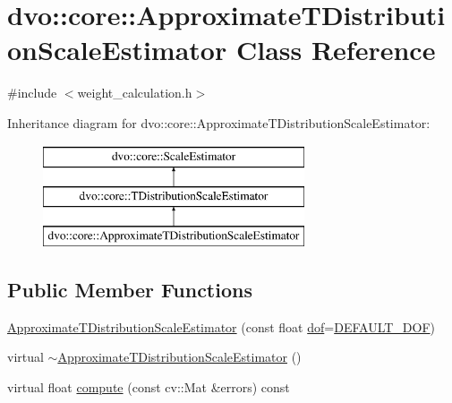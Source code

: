 \hypertarget{classdvo_1_1core_1_1_approximate_t_distribution_scale_estimator}{}\section{dvo\+:\+:core\+:\+:Approximate\+T\+Distribution\+Scale\+Estimator Class Reference}
\label{classdvo_1_1core_1_1_approximate_t_distribution_scale_estimator}


{\ttfamily \#include $<$weight\+\_\+calculation.\+h$>$}

Inheritance diagram for dvo\+:\+:core\+:\+:Approximate\+T\+Distribution\+Scale\+Estimator\+:\begin{figure}[H]
\begin{center}
\leavevmode
\includegraphics[height=3.000000cm]{classdvo_1_1core_1_1_approximate_t_distribution_scale_estimator}
\end{center}
\end{figure}
\subsection*{Public Member Functions}
\begin{DoxyCompactItemize}
\item 
\mbox{\hyperlink{classdvo_1_1core_1_1_approximate_t_distribution_scale_estimator_aaa8e0b24e62dd26cb712a2253ae47a1c}{Approximate\+T\+Distribution\+Scale\+Estimator}} (const float \mbox{\hyperlink{classdvo_1_1core_1_1_t_distribution_scale_estimator_a4c5ece510a3315bad7ca711a27466eb9}{dof}}=\mbox{\hyperlink{classdvo_1_1core_1_1_t_distribution_scale_estimator_a031ff291023c516c23bce04b34b79957}{D\+E\+F\+A\+U\+L\+T\+\_\+\+D\+OF}})
\item 
virtual \mbox{\hyperlink{classdvo_1_1core_1_1_approximate_t_distribution_scale_estimator_ac87b6733d044e01a947620a79b5368a8}{$\sim$\+Approximate\+T\+Distribution\+Scale\+Estimator}} ()
\item 
virtual float \mbox{\hyperlink{classdvo_1_1core_1_1_approximate_t_distribution_scale_estimator_aee2b37700df1eb0125b8e0d352f7ceab}{compute}} (const cv\+::\+Mat \&errors) const
\end{DoxyCompactItemize}
